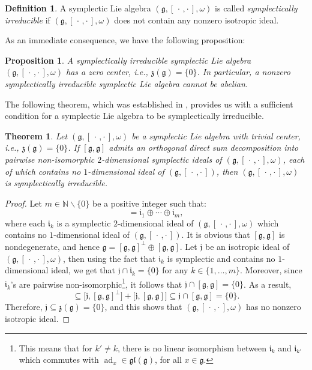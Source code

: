 \documentclass[final,1p,times,nopreprintline]{elsarticle}
\newtheorem{theorem}{Theorem}[section]
\newtheorem{proposition}{Proposition}[section]
\theoremstyle{definition}
\newtheorem{definition}{Definition}[section]
\numberwithin{equation}{section}
\newcommand{\nat}{\mathbb{N}}
\newcommand{\w}{\omega}
\newcommand{\g}{\mathfrak{g}}
\newcommand{\ad}{\operatorname{ad}}
\numberwithin{equation}{section}
\newcommand{\z}{\mathfrak{z}}
\newcommand{\ii}{\mathfrak{i}}
\newcommand{\gl}{\mathfrak{gl}}
\newcommand{\cro}{[\,\cdot\,,\cdot\,]}
\newcommand{\jj}{\mathfrak{j}}
\begin{document}
\begin{definition}\label{DefSymplecIrreduciSec6}
	A symplectic Lie algebra $(\g,[\,\cdot\,,\cdot\,],\w)$ is called \textit{symplectically irreducible} if $(\g,[\,\cdot\,,\cdot\,],\w)$ does not contain any nonzero isotropic ideal.
\end{definition}

As an immediate consequence, we have the following proposition:

\begin{proposition}
	A symplectically irreducible symplectic Lie algebra $(\g,\cro,\w)$ has a zero center, i.e., $\mathfrak{z}(\g)=\{0\}$. In particular, a nonzero symplectically irreducible symplectic Lie algebra cannot be abelian.
\end{proposition}

The following theorem, which was established in \cite[p. 38]{Bau}, provides us with a sufficient condition for a symplectic Lie algebra to be symplectically irreducible.

\begin{theorem}\label{T1SymplIrredu00}
Let $(\g,\cro,\w)$ be a symplectic Lie algebra with trivial center, i.e., $\z(\g)=\{0\}$. If $[\g,\g]$ admits an orthogonal direct sum decomposition into pairwise non-isomorphic $2$-dimensional symplectic ideals of $(\g,\cro,\w)$, each of which contains no $1$-dimensional ideal of $(\g,\cro)$, then $(\g,\cro,\w)$ is symplectically irreducible.
\end{theorem}

\begin{proof}
Let $m\in\nat\backslash\{0\}$ be a positive integer such that:
\begin{equation*}
[\g,\g]=\ii_1\oplus\cdots\oplus\ii_m,
\end{equation*}
where each $\ii_k$ is a symplectic $2$-dimensional ideal of $(\g,\cro,\w)$ which contains no $1$-dimensional ideal of $(\g,\cro)$. It is obvious that $[\g,\g]$ is nondegenerate, and hence $\g=[\g,\g]^\perp\oplus [\g,\g]$. Let $\jj$ be an isotropic ideal of $(\g,\cro,\w)$, then using the fact that $\ii_k$ is symplectic and contains no $1$-dimensional ideal, we get that $\jj\cap\ii_k=\{0\}$ for any $k\in\{1,\ldots,m\}$. Moreover, since $\ii_k$'s are pairwise non-isomorphic\footnote{This means that for $k'\neq k$, there is no linear isomorphism between $\ii_k$ and $\ii_{k'}$ which commutes with $\ad_x\in\gl(\g)$, for all $x\in\g$.}, it follows that $\jj\cap [\g,\g]=\{0\}$. As a result,
\begin{equation*}
[\jj,\g]\subseteq \big[\jj,[\g,\g]^\perp\big]+\big[\jj,[\g,\g]\big]\subseteq\jj\cap [\g,\g]=\{0\}.
\end{equation*}
Therefore, $\jj\subseteq\z(\g)=\{0\}$, and this shows that $(\g,\cro,\w)$ has no nonzero isotropic ideal.
\end{proof}
\end{document}
